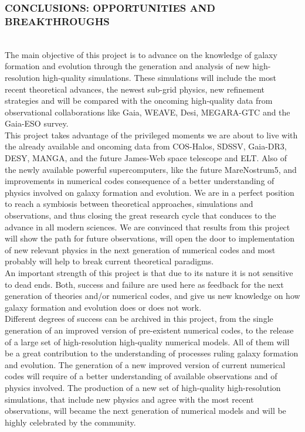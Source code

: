 \documentclass[oneside, a4paper, onecolumn, 11pt]{article}
\begin{document}
{\subsubsection*{CONCLUSIONS: OPPORTUNITIES AND BREAKTHROUGHS}\\

The main objective of this project is to advance on the knowledge of galaxy formation and evolution through the generation and analysis of new high-resolution high-quality simulations. These simulations will include the most recent theoretical advances, the newest sub-grid physics, new refinement strategies and will be compared with the oncoming high-quality data from observational collaborations like Gaia, WEAVE, Desi, MEGARA-GTC and the Gaia-ESO survey.\\
This project takes advantage of the privileged moments we are about to live with the already available and oncoming data from COS-Halos, SDSSV, Gaia-DR3, DESY, MANGA, and the future James-Web space telescope and ELT. Also of the newly available powerful supercomputers, like the future MareNostrum5, and improvements in numerical codes consequence of a better understanding of physics involved on galaxy formation and evolution. We are in a perfect position to reach a symbiosis between theoretical approaches, simulations and observations, and thus closing the great research cycle that conduces to the advance in all modern sciences. We are convinced that results from this project will show the path for future observations, will open the door to implementation of new relevant physics in the next generation of numerical codes and most probably will help to break current theoretical paradigms.\\
An important strength of this project is that due to its nature it is not sensitive to dead ends. Both, success and failure are used here as feedback for the next generation of theories and/or numerical codes, and give us new knowledge on how galaxy formation and evolution does or does not work.\\
Different degrees of success can be archived in this project, from the single generation of an improved version of pre-existent numerical codes, to the release of a large set of high-resolution high-quality numerical models. All of them will be a great contribution to the understanding of processes ruling galaxy formation and evolution. The generation of a new improved version of current numerical codes will require of a better understanding of available observations and of physics involved. The production of a new set of high-quality high-resolution simulations, that include new physics and agree with the most recent observations, will became the next generation of numerical models and will be highly celebrated by the community.



}
\end{document}

